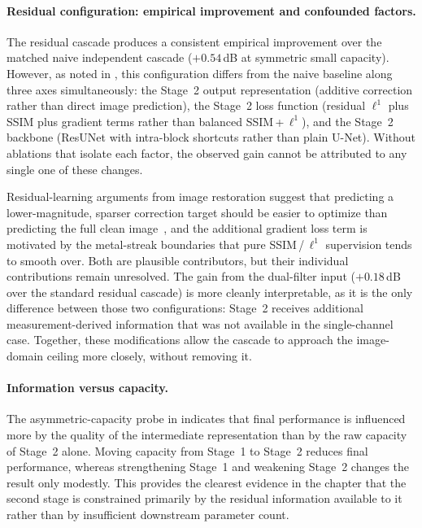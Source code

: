 \paragraph{Residual configuration: empirical improvement and confounded factors.}
The residual cascade produces a consistent empirical improvement over the matched naive independent cascade ($+0.54$\,dB at symmetric small capacity). However, as noted in , this configuration differs from the naive baseline along three axes simultaneously: the Stage~2 output representation (additive correction rather than direct image prediction), the Stage~2 loss function (residual $\ell^{1}$ plus SSIM plus gradient terms rather than balanced SSIM\,+\,$\ell^{1}$), and the Stage~2 backbone (ResUNet with intra-block shortcuts rather than plain U-Net). Without ablations that isolate each factor, the observed gain cannot be attributed to any single one of these changes.

Residual-learning arguments from image restoration suggest that predicting a lower-magnitude, sparser correction target should be easier to optimize than predicting the full clean image~\cite{Zhang2017}, and the additional gradient loss term is motivated by the metal-streak boundaries that pure SSIM\,/\,$\ell^{1}$ supervision tends to smooth over. Both are plausible contributors, but their individual contributions remain unresolved. The gain from the dual-filter input ($+0.18$\,dB over the standard residual cascade) is more cleanly interpretable, as it is the only difference between those two configurations: Stage~2 receives additional measurement-derived information that was not available in the single-channel case. Together, these modifications allow the cascade to approach the image-domain ceiling more closely, without removing it.

\paragraph{Information versus capacity.}
The asymmetric-capacity probe in  indicates that final performance is influenced more by the quality of the intermediate representation than by the raw capacity of Stage~2 alone. Moving capacity from Stage~1 to Stage~2 reduces final performance, whereas strengthening Stage~1 and weakening Stage~2 changes the result only modestly. This provides the clearest evidence in the chapter that the second stage is constrained primarily by the residual information available to it rather than by insufficient downstream parameter count.


